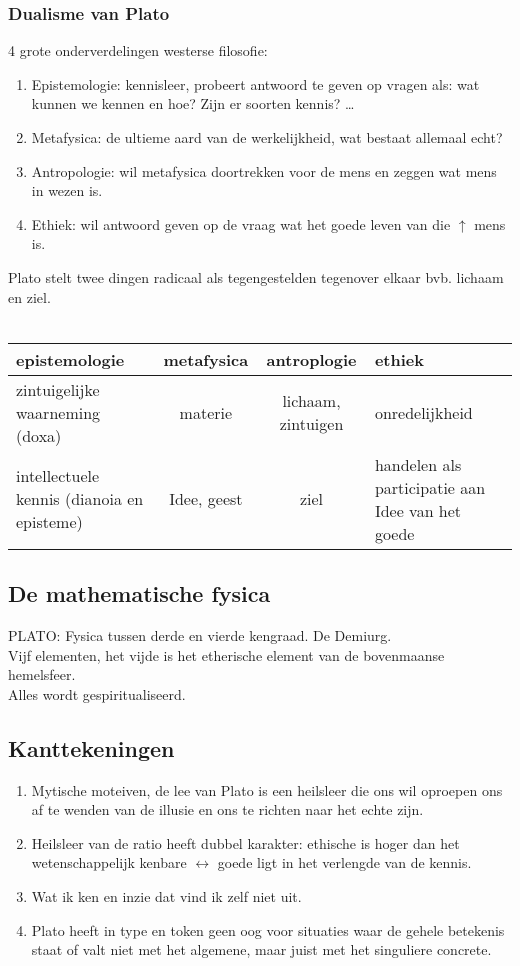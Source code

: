 \documentclass[11pt,a4paper]{article}
\begin{document}
\subsubsection*{Dualisme van Plato}
4 grote onderverdelingen westerse filosofie:
\begin{enumerate}
\item Epistemologie: kennisleer, probeert antwoord te geven op vragen als: wat kunnen we kennen en hoe? Zijn er soorten kennis? \dots
\item Metafysica: de ultieme aard van de werkelijkheid, wat bestaat allemaal echt?
\item Antropologie: wil metafysica doortrekken voor de mens en zeggen wat mens in wezen is.
\item Ethiek: wil antwoord geven op de vraag wat het goede leven van die $\uparrow$ mens is.
\end{enumerate}
Plato stelt twee dingen radicaal als tegengestelden tegenover elkaar bvb. lichaam en ziel.
\\
\\
\begin{tabular}{p{4cm} c c p{5cm}}
	\hline
	\hline
	epistemologie & metafysica & antroplogie & ethiek \\
	\hline
	\hline
	zintuigelijke waarneming (doxa) & materie & lichaam, zintuigen & onredelijkheid \\
	\hline
	intellectuele kennis (dianoia en episteme) & Idee, geest & ziel & handelen als participatie aan Idee van het goede \\
	\hline
	\hline
\end{tabular}
\subsection{De mathematische fysica}
PLATO: 
Fysica tussen derde en vierde kengraad. 
De Demiurg.
\\
Vijf elementen, het vijde is het etherische element van de bovenmaanse hemelsfeer.
\\
Alles wordt gespiritualiseerd.
\subsection{Kanttekeningen}
\begin{enumerate}
\item Mytische moteiven, de lee van Plato is een heilsleer die ons wil oproepen ons af te wenden van de illusie en ons te richten naar het echte zijn.
\item Heilsleer van de ratio heeft dubbel karakter: ethische is hoger dan het wetenschappelijk kenbare $\leftrightarrow$ goede ligt in het verlengde van de kennis.
\item Wat ik ken en inzie dat vind ik zelf niet uit.
\item Plato heeft in type en token geen oog voor situaties waar de gehele betekenis staat of valt niet met het algemene, maar juist met het singuliere concrete.
\end{enumerate}
\end{document}
